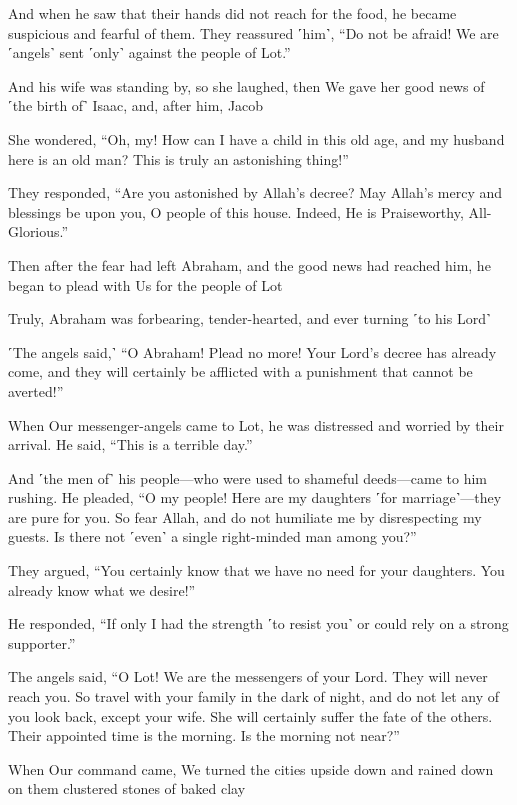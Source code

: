 And when he saw that their hands did not reach for the food, he became suspicious and fearful of them. They reassured ˹him˺, “Do not be afraid! We are ˹angels˺ sent ˹only˺ against the people of Lot.”

And his wife was standing by, so she laughed, then We gave her good news of ˹the birth of˺ Isaac, and, after him, Jacob

She wondered, “Oh, my! How can I have a child in this old age, and my husband here is an old man? This is truly an astonishing thing!”

They responded, “Are you astonished by Allah’s decree? May Allah’s mercy and blessings be upon you, O people of this house. Indeed, He is Praiseworthy, All-Glorious.”

Then after the fear had left Abraham, and the good news had reached him, he began to plead with Us for the people of Lot

Truly, Abraham was forbearing, tender-hearted, and ever turning ˹to his Lord˺

˹The angels said,˺ “O Abraham! Plead no more! Your Lord’s decree has already come, and they will certainly be afflicted with a punishment that cannot be averted!”

When Our messenger-angels came to Lot, he was distressed and worried by their arrival. He said, “This is a terrible day.”

And ˹the men of˺ his people—who were used to shameful deeds—came to him rushing. He pleaded, “O my people! Here are my daughters ˹for marriage˺—they are pure for you. So fear Allah, and do not humiliate me by disrespecting my guests. Is there not ˹even˺ a single right-minded man among you?”

They argued, “You certainly know that we have no need for your daughters. You already know what we desire!”

He responded, “If only I had the strength ˹to resist you˺ or could rely on a strong supporter.”

The angels said, “O Lot! We are the messengers of your Lord. They will never reach you. So travel with your family in the dark of night, and do not let any of you look back, except your wife. She will certainly suffer the fate of the others. Their appointed time is the morning. Is the morning not near?”

When Our command came, We turned the cities upside down and rained down on them clustered stones of baked clay

